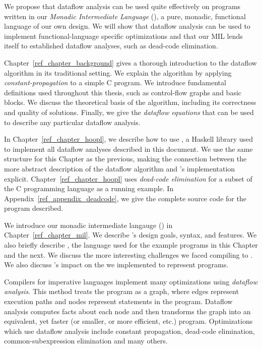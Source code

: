 We propose that dataflow analysis can be used quite effectively on
programs written in our \emph{Monadic Intermediate Language} (\mil), a
pure, monadic, functional language of our own design. We will show
that dataflow analysis can be used to implement functional-language
specific optimizations and that our MIL lends itself to established
dataflow analyses, such as dead-code elimination.

 Chapter~\ref{ref_chapter_background}  gives 
a thorough introduction to the dataflow algorithm in its traditional
setting. We explain the algorithm by
applying \emph{constant-propagation} to a simple C program. We
introduce fundamental definitions used throughout this thesis, such as
control-flow graphs and basic blocks. We discuss the theoretical basis
of the algorithm, including its correctness and quality of
solutions. Finally, we give the \emph{dataflow equations} that can be
used to describe any particular dataflow analysis.

 In Chapter~\ref{ref_chapter_hoopl},
we describe how to use \hoopl \citep{Hoopl-3.8.7.0}, a Haskell library
used to implement all dataflow analyses described in this document. We
use the same structure for this Chapter as the previous, making the
connection between the more abstract description of the dataflow
algorithm and \hoopl's implementation
explicit. Chapter~\ref{ref_chapter_hoopl} uses \emph{dead-code
elimination} for a subset of the C programming language as a running
example. In Appendix~\ref{ref_appendix_deadcode}, we give the complete
source code for the program described.

 We introduce our monadic 
intermediate langauge (\mil) in Chapter~\ref{ref_chapter_mil}. We describe
\mil's design goals, syntax, and features. We also briefly describe
\lamC, the language used for the example programs in this Chapter and the next. We
discuss the more interesting challenges we faced compiling \lamC
to \mil. We also discuss \hoopl's impact on the \ast we implemented to
represent \mil programs.



Compilers for imperative languages implement many optimizations using
\emph{dataflow analysis}. This method treats the program as a graph,
where edges represent execution paths and nodes represent statements
in the program. Dataflow analysis computes facts about each node and
then transforms the graph into an equivalent, yet faster (or smaller,
or more efficient, etc.) program. Optimizations which use dataflow
analysis include constant propagation, dead-code elimination,
common-subexpression elimination and many others.

